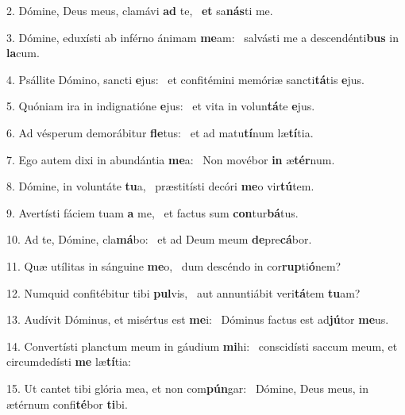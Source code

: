 2. Dómine, Deus meus, clamávi \textbf{ad} te, \ast\  \textbf{et} sa\textbf{nás}ti me.\

3. Dómine, eduxísti ab inférno ánimam \textbf{me}am: \ast\  salvásti me a descendénti\textbf{bus} in \textbf{la}cum.\

4. Psállite Dómino, sancti \textbf{e}jus: \ast\  et confitémini memóriæ sancti\textbf{tá}tis \textbf{e}jus.\

5. Quóniam ira in indignatióne \textbf{e}jus: \ast\  et vita in volun\textbf{tá}te \textbf{e}jus.\

6. Ad vésperum demorábitur \textbf{fle}tus: \ast\  et ad matu\textbf{tí}num læ\textbf{tí}tia.\

7. Ego autem dixi in abundántia \textbf{me}a: \ast\  Non movébor \textbf{in} æ\textbf{tér}num.\

8. Dómine, in voluntáte \textbf{tu}a, \ast\  præstitísti decóri \textbf{me}o vir\textbf{tú}tem.\

9. Avertísti fáciem tuam \textbf{a} me, \ast\  et factus sum \textbf{con}tur\textbf{bá}tus.\

10. Ad te, Dómine, cla\textbf{má}bo: \ast\  et ad Deum meum \textbf{de}pre\textbf{cá}bor.\

11. Quæ utílitas in sánguine \textbf{me}o, \ast\  dum descéndo in cor\textbf{rup}ti\textbf{ó}nem?\

12. Numquid confitébitur tibi \textbf{pul}vis, \ast\  aut annuntiábit veri\textbf{tá}tem \textbf{tu}am?\

13. Audívit Dóminus, et misértus est \textbf{me}i: \ast\  Dóminus factus est ad\textbf{jú}tor \textbf{me}us.\

14. Convertísti planctum meum in gáudium \textbf{mi}hi: \ast\  conscidísti saccum meum, et circumdedísti \textbf{me} læ\textbf{tí}tia:\

15. Ut cantet tibi glória mea, et non com\textbf{pún}gar: \ast\  Dómine, Deus meus, in ætérnum confi\textbf{té}bor \textbf{ti}bi.\

